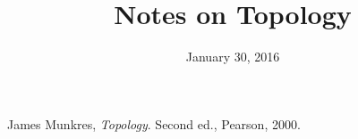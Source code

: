 \documentclass{article}
\title{Notes on Topology}
\date{January 30, 2016}
\begin{document}
\maketitle
\tableofcontents




\begin{thebibliography}{99}
 James Munkres,
  \emph{Topology}.
  Second ed., Pearson, 2000.
\end{thebibliography}
\end{document}
